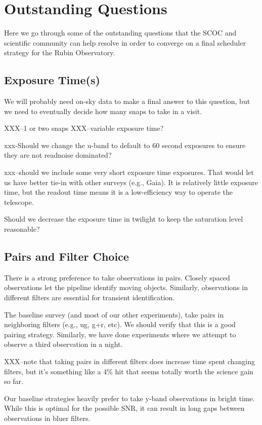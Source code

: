 
\section{Outstanding Questions}\label{sec:questions}

Here we go through some of the outstanding questions that the SCOC and scientific community can help resolve in order to converge on a final scheduler strategy for the Rubin Observatory. 

\subsection{Exposure Time(s)}

We will probably need on-sky data to make a final answer to this question, but we need to eventually decide how many snaps to take in a visit.

XXX--1 or two snaps
XXX--variable exposure time?

xxx-Should we change the u-band to default to 60 second exposures to ensure they are not readnoise dominated? 

xxx--should we include some very short exposure time exposures. That would let us have better tie-in with other surveys (e.g., Gaia).  It is relatively little exposure time, but the readout time means it is a low-efficiency way to operate the telescope. 

Should we decrease the exposure time in twilight to keep the saturation level reasonable?

\subsection{Pairs and Filter Choice}

There is a strong preference to take observations in pairs. Closely spaced observations let the pipeline identify moving objects. Similarly, observations in different filters are essential for transient identification. 

The baseline survey (and most of our other experiments), take pairs in neighboring filters (e.g., ug, g+r, etc).  We should verify that this is a good pairing strategy. Similarly, we have done experiments where we attempt to observe a third observation in a night. 

XXX--note that taking pairs in different filters does increase time spent changing filters, but it's something like a 4\% hit that seems totally worth the science gain so far. 

Our baseline strategies heavily prefer to take y-band observations in bright time. While this is optimal for the possible SNR, it can result in long gaps between observations in bluer filters. 

